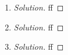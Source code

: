 \documentclass{article}
\begin{document}
\begin{enumerate}
	\item \begin{proof}[Solution]\let\qed\relax
		ff
	\end{proof}
	\item \begin{proof}[Solution]\let\qed\relax
		ff
	\end{proof}
	\item \begin{proof}[Solution]\let\qed\relax
		ff
	\end{proof} 
\end{enumerate}
\end{document}
